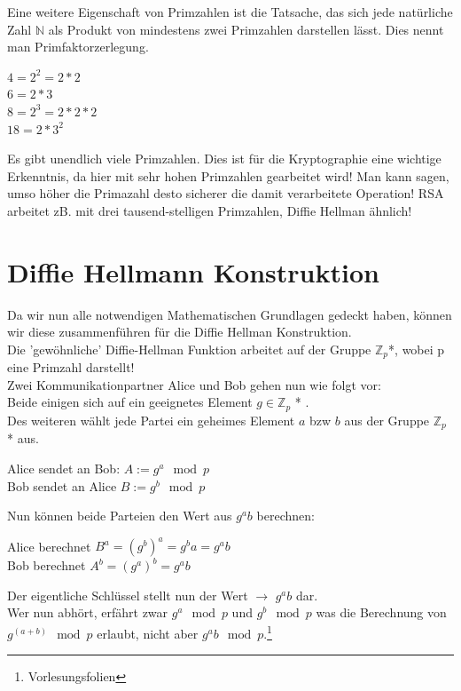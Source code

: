 \documentclass[a4paper,12pt]{scrartcl}
\begin{document}
Eine weitere Eigenschaft von Primzahlen ist die Tatsache, das sich jede natürliche Zahl $\mathbb{N}$ als Produkt von mindestens zwei Primzahlen darstellen lässt. Dies nennt man Primfaktorzerlegung.
\begin{center}
 $4 = 2^2 = 2 * 2$\\
 $6 = 2 * 3$\\
 $8 = 2^3 = 2 * 2 * 2$\\
 $18 = 2 * 3^2$
\end{center}

Es gibt unendlich viele Primzahlen. Dies ist für die Kryptographie eine wichtige Erkenntnis, da hier mit sehr hohen Primzahlen gearbeitet wird! Man kann sagen, umso höher die Primazahl desto sicherer die damit verarbeitete Operation! RSA arbeitet zB. mit drei tausend-stelligen Primzahlen, Diffie Hellman ähnlich!


\newpage
\section{Diffie Hellmann Konstruktion}
Da wir nun alle notwendigen Mathematischen Grundlagen gedeckt haben, können wir diese zusammenführen für die Diffie Hellman Konstruktion.\\

Die 'gewöhnliche' Diffie-Hellman Funktion arbeitet auf der Gruppe $\mathbb{Z}_{p}$*, wobei p eine Primzahl darstellt!\\
Zwei Kommunikationpartner Alice und Bob gehen nun wie folgt vor:\\
Beide einigen sich auf ein geeignetes Element $g \in \mathbb{Z}_{p}$ * .\\
Des weiteren wählt jede Partei ein geheimes Element $a$ bzw $b$ aus der Gruppe $\mathbb{Z}_{p}$ * aus.\\
\begin{center}
 Alice sendet an Bob: $A := g^a \mod p$\\
 Bob sendet an Alice $B := g^b \mod p$
\end{center}
Nun können beide Parteien den Wert aus $g^ab$ berechnen:
\begin{center}
 Alice berechnet $B^a = (g^b)^a = g^ba = g^ab$\\
 Bob berechnet $A^b = (g^a)^b = g^ab$ 
\end{center}
Der eigentliche Schlüssel stellt nun der Wert $\rightarrow$ $g^ab$ dar.\\
Wer nun abhört, erfährt zwar $g^a \mod p$ und $g^b \mod p$ was die Berechnung von $g^(a+b) \mod p$ erlaubt, nicht aber $g^ab \mod p$.\footnote{Vorlesungsfolien}
\newpage
\end{document}
